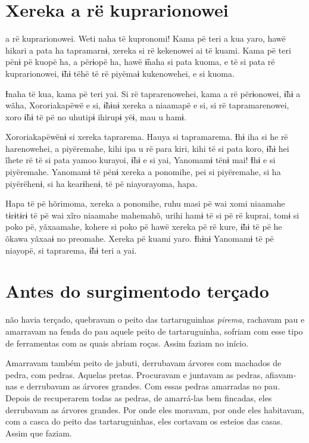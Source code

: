 \chapter{Xereka a rë kuprarionowei}
 
 a rë kuprarionowei. Weti naha të kupronomi! Kama pë teri a kua
yaro, hawë hikari a pata ha tapramarnɨ, xereka si rë kekenowei ai të
kuami. Kama pë teri pënɨ pë kuopë ha, a përɨopë ha, hawë ɨ̃naha si pata
kuoma, e të si pata rë kuprarionowei, ɨ̃hɨ tëhë të rë
piyëmaɨ kukenowehei, e si kuoma. 

Ɨnaha të kua, kama pë teri yai. Si rë taprarenowehei, kama a rë
përɨonowei, ɨ̃hɨ a wãha, Xororiakapëwë e si, ɨ̃hɨnɨ xereka a niaamapë e
si, si rë tapramarenowei, xoro ɨ̃hɨ të pë no uhutipɨ ihirupɨ yëɨ, mau u
hamɨ. 

Xororiakapëwënɨ si xereka taprarema. Hauya si tapramarema. Ɨhɨ iha si he
rë harenowehei, a piyëremahe, kihi ipa u rë para kiri, kihi të si pata
koro, ɨ̃hɨ hei ĩhete rë të si pata yamoo kurayoi, ɨ̃hɨ e si yai,
Yanomamɨ tënɨ mai! Ɨhɨ e si piyëremahe. Yanomamɨ të pënɨ xereka a
ponomihe, pei si piyëremahe, si ha piyërëhenɨ, si ha kearɨhenɨ, të pë
niayorayoma, hapa. 

Hapa të pë hõrimoma, xereka a ponomihe, ruhu masi pë wai xomi niaamahe
tɨrɨtɨrɨ të pë wai xĩro niaamahe mahemahõ, urihi hamɨ të si pë rë
kuprai, tomɨ si poko pë, yãxaamahe, kohere si poko pë hawë xereka pë rë
kure, ɨ̃hɨ të pë he õkawa yãxaaɨ no preomahe. Xereka pë kuami yaro.
Ɨhɨnɨ Yanomamɨ të pë niayopë, si taprarema, ɨ̃hɨ teri a yai.

\chapter[Antes do surgimento do terçado]{Antes do surgimento\break do terçado}
 
 não havia terçado, quebravam o peito das
tartaruguinhas \textit{pirema}, rachavam pau e amarravam na fenda do pau
aquele peito de tartaruguinha, sofriam com esse tipo de ferramentas com
as quais abriam roças. Assim faziam no início.

Amarravam também peito de jabuti, derrubavam árvores com machados de
pedra, com pedras. Aquelas pretas. Procuravam e juntavam as pedras,
afiavam-nas e derrubavam as árvores grandes. Com essas pedras amarradas
no pau. Depois de recuperarem todas as pedras, de amarrá-las bem
fincadas, eles derrubavam as árvores grandes. Por onde eles moravam, por
onde eles habitavam, com a casca do peito das tartaruguinhas, eles
cortavam os esteios das casas. Assim que faziam.

